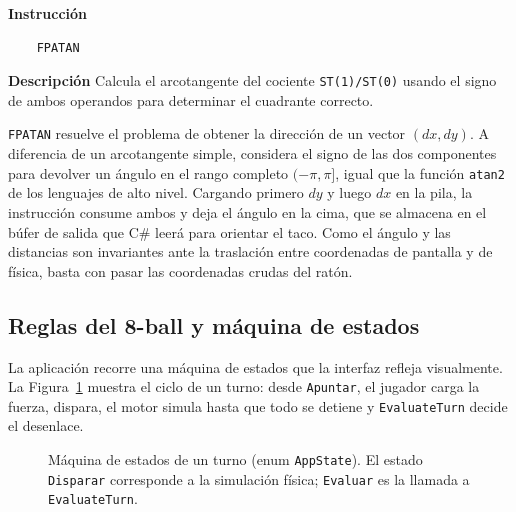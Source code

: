 \documentclass[a4paper,12pt]{article}
\begin{document}
\begin{instruccionbox}
\textbf{Instrucción}
\begin{lstlisting}
    FPATAN
\end{lstlisting}
\textbf{Descripción}
Calcula el arcotangente del cociente \texttt{ST(1)/ST(0)} usando el signo de ambos operandos para determinar el cuadrante correcto.
\end{instruccionbox}

\texttt{FPATAN} resuelve el problema de obtener la dirección de un vector \((dx, dy)\). A diferencia de un arcotangente simple, considera el signo de las dos componentes para devolver un ángulo en el rango completo \((-\pi, \pi]\), igual que la función \texttt{atan2} de los lenguajes de alto nivel. Cargando primero \(dy\) y luego \(dx\) en la pila, la instrucción consume ambos y deja el ángulo en la cima, que se almacena en el búfer de salida que C\# leerá para orientar el taco. Como el ángulo y las distancias son invariantes ante la traslación entre coordenadas de pantalla y de física, basta con pasar las coordenadas crudas del ratón.

\subsection{Reglas del 8-ball y máquina de estados}
La aplicación recorre una máquina de estados que la interfaz refleja visualmente. La Figura~\ref{fig:estados} muestra el ciclo de un turno: desde \texttt{Apuntar}, el jugador carga la fuerza, dispara, el motor simula hasta que todo se detiene y \texttt{EvaluateTurn} decide el desenlace.

\begin{figure}[H]
\centering
{}
\caption{Máquina de estados de un turno (enum \texttt{AppState}). El estado \texttt{Disparar} corresponde a la simulación física; \texttt{Evaluar} es la llamada a \texttt{EvaluateTurn}.}
\label{fig:estados}
\end{figure}
\end{document}
